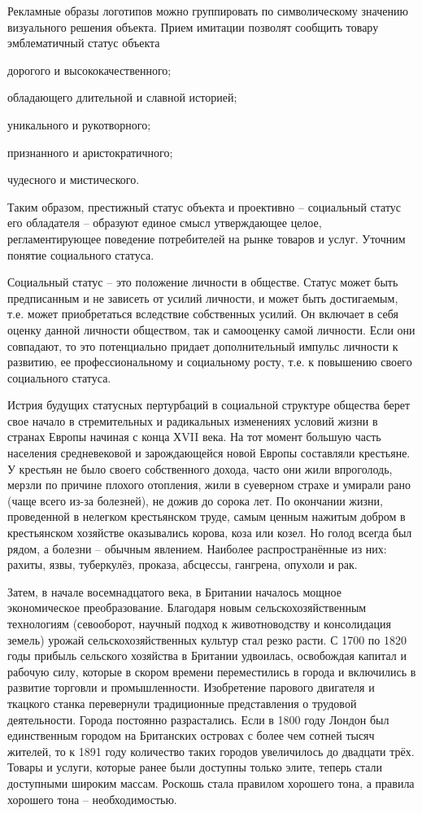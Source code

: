 Рекламные образы логотипов можно группировать по символическому значению
визуального решения
объекта\autocite[][107]{pavlovskaya2003design}. Прием имитации позволят сообщить
товару эмблематичный статус объекта
\begin{enumerate*}[label=\asbuk*)]
\item дорогого и высококачественного;
\item обладающего длительной и славной историей;
\item уникального и рукотворного;
\item признанного и аристократичного;
\item чудесного и мистического.
\end{enumerate*}
Таким образом, престижный статус объекта и проективно -- социальный статус его
обладателя -- образуют единое смысл утверждающее целое, регламентирующее
поведение потребителей на рынке товаров и услуг. Уточним понятие социального
статуса.

Социальный статус -- это положение личности в обществе. Статус может быть
предписанным и не зависеть от усилий личности, и может быть достигаемым, т.е.
может приобретаться вследствие собственных усилий. Он включает в себя оценку
данной личности обществом, так и самооценку самой личности. Если они совпадают,
то это потенциально придает дополнительный импульс личности к развитию, ее
профессиональному и социальному росту, т.е. к повышению своего социального
статуса.

Истрия будущих статусных пертурбаций в социальной структуре общества берет свое
начало в стремительных и радикальных изменениях условий жизни в странах Европы
начиная с конца ХVII века. На тот момент большую часть населения средневековой
и зарождающейся новой Европы составляли крестьяне. У крестьян не было своего
собственного дохода, часто они жили впроголодь, мерзли по причине плохого
отопления,  жили в суеверном страхе и умирали  рано (чаще всего из-за болезней),
не дожив до сорока лет. По окончании жизни, проведенной в нелегком крестьянском
труде, самым ценным нажитым добром в крестьянском хозяйстве оказывались корова,
коза или козел. Но голод всегда был рядом, а болезни -- обычным явлением.
Наиболее распространённые из них: рахиты, язвы, туберкулёз, проказа, абсцессы,
гангрена, опухоли и рак.

Затем, в начале восемнадцатого века, в Британии началось мощное экономическое
преобразование. Благодаря новым сельскохозяйственным технологиям (севооборот,
научный подход к животноводству и консолидация земель) урожай
сельскохозяйственных культур стал резко расти. С 1700 по 1820 годы прибыль
сельского хозяйства в Британии удвоилась, освобождая капитал и рабочую силу,
которые в скором времени переместились в города и включились в развитие торговли
и промышленности. Изобретение парового двигателя и ткацкого станка перевернули
традиционные представления о трудовой деятельности. Города постоянно
разрастались. Если в 1800 году Лондон был единственным городом на Британских
островах с более чем сотней тысяч жителей, то к 1891 году количество таких
городов увеличилось до двадцати трёх. Товары и услуги, которые ранее были
доступны только элите, теперь стали доступными широким массам. Роскошь стала
правилом хорошего тона, а правила хорошего тона -- необходимостью.

